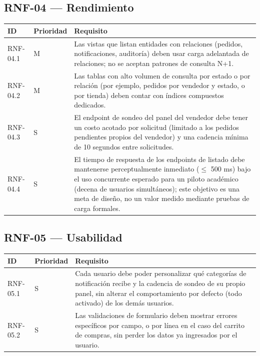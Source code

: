\documentclass[12pt,a4paper]{report}
\begin{document}
\subsection{RNF-04 --- Rendimiento}

\begin{longtable}{|p{2.5cm}|p{2cm}|p{9.5cm}|}
\hline
\textbf{ID} & \textbf{Prioridad} & \textbf{Requisito} \\ \hline
RNF-04.1 & M & Las vistas que listan entidades con relaciones (pedidos, notificaciones, auditoría) deben usar carga adelantada de relaciones; no se aceptan patrones de consulta N+1. \\ \hline
RNF-04.2 & M & Las tablas con alto volumen de consulta por estado o por relación (por ejemplo, pedidos por vendedor y estado, o por tienda) deben contar con índices compuestos dedicados. \\ \hline
RNF-04.3 & S & El endpoint de sondeo del panel del vendedor debe tener un costo acotado por solicitud (limitado a los pedidos pendientes propios del vendedor) y una cadencia mínima de 10 segundos entre solicitudes. \\ \hline
RNF-04.4 & S & El tiempo de respuesta de los endpoints de listado debe mantenerse perceptualmente inmediato ($\leq$ 500 ms) bajo el uso concurrente esperado para un piloto académico (decena de usuarios simultáneos); este objetivo es una meta de diseño, no un valor medido mediante pruebas de carga formales. \\ \hline
\end{longtable}

\subsection{RNF-05 --- Usabilidad}

\begin{longtable}{|p{2.5cm}|p{2cm}|p{9.5cm}|}
\hline
\textbf{ID} & \textbf{Prioridad} & \textbf{Requisito} \\ \hline
RNF-05.1 & S & Cada usuario debe poder personalizar qué categorías de notificación recibe y la cadencia de sondeo de su propio panel, sin alterar el comportamiento por defecto (todo activado) de los demás usuarios. \\ \hline
RNF-05.2 & S & Las validaciones de formulario deben mostrar errores específicos por campo, o por línea en el caso del carrito de compras, sin perder los datos ya ingresados por el usuario. \\ \hline
\end{longtable}
\end{document}
